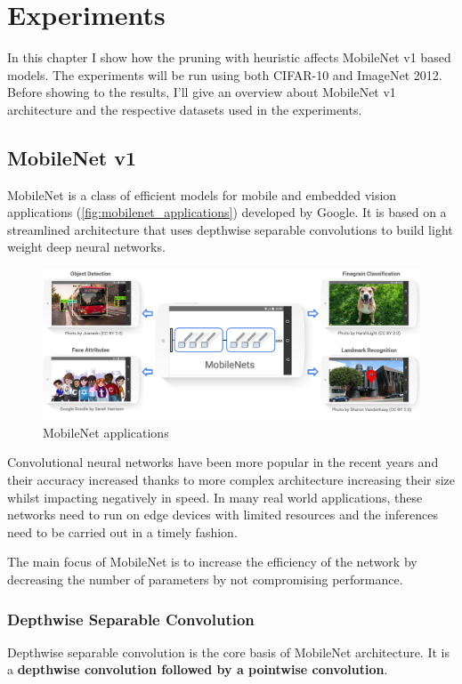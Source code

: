 \chapter{Experiments}\label{ch:experiments}
In this chapter I show how the pruning with heuristic affects MobileNet
v1\cite{howard2017mobilenets} based models. The experiments will be run using
both CIFAR-10\cite{cifar_10} and ImageNet 2012\cite{imagenet_cvpr09}.
Before showing to the results, I'll give an overview about MobileNet v1
architecture and the respective datasets used in the experiments.

\section{MobileNet v1}
MobileNet is a class of efficient models for mobile and embedded vision
applications (\autoref{fig:mobilenet_applications}) developed by Google.
It is based on a streamlined architecture that uses depthwise separable
convolutions to build light weight deep neural networks.

\begin{figure}[ht]
    \includegraphics[width=\textwidth]{images/experiments/mobilenet_applications.png}
    \centering
    \caption{MobileNet applications}\label{fig:mobilenet_applications}
\end{figure}

Convolutional neural networks have been more popular in the recent years and
their accuracy increased thanks to more complex architecture increasing their
size whilst impacting negatively in speed. In many real world applications,
these networks need to run on edge devices with limited resources and the
inferences need to be carried out in a timely fashion.

The main focus of MobileNet is to increase the efficiency of the network by
decreasing the number of parameters by not compromising
performance\cite{review_mobilenet}.

\subsection{Depthwise Separable Convolution}
Depthwise separable convolution is the core basis of MobileNet architecture. It
is a \textbf{depthwise convolution followed by a pointwise convolution}.

